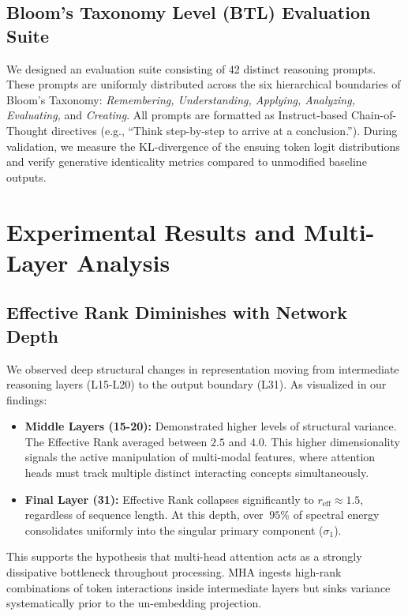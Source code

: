 \documentclass{article}
\begin{document}
\subsection{Bloom's Taxonomy Level (BTL) Evaluation Suite}

We designed an evaluation suite consisting of 42 distinct reasoning prompts. These prompts are uniformly distributed across the six hierarchical boundaries of Bloom's Taxonomy: \textit{Remembering, Understanding, Applying, Analyzing, Evaluating,} and \textit{Creating}. All prompts are formatted as Instruct-based Chain-of-Thought directives (e.g., ``Think step-by-step to arrive at a conclusion.''). During validation, we measure the KL-divergence of the ensuing token logit distributions and verify generative identicality metrics compared to unmodified baseline outputs.

\section{Experimental Results and Multi-Layer Analysis}

\subsection{Effective Rank Diminishes with Network Depth}

We observed deep structural changes in representation moving from intermediate reasoning layers (L15-L20) to the output boundary (L31). As visualized in our findings:

\begin{itemize}
    \item \textbf{Middle Layers (15-20):} Demonstrated higher levels of structural variance. The Effective Rank averaged between $2.5$ and $4.0$. This higher dimensionality signals the active manipulation of multi-modal features, where attention heads must track multiple distinct interacting concepts simultaneously.
    \item \textbf{Final Layer (31):} Effective Rank collapses significantly to $r_{\text{eff}} \approx 1.5$, regardless of sequence length. At this depth, over $~95\%$ of spectral energy consolidates uniformly into the singular primary component ($\sigma_1$).
\end{itemize}

This supports the hypothesis that multi-head attention acts as a strongly dissipative bottleneck throughout processing. MHA ingests high-rank combinations of token interactions inside intermediate layers but sinks variance systematically prior to the un-embedding projection. 
\end{document}
